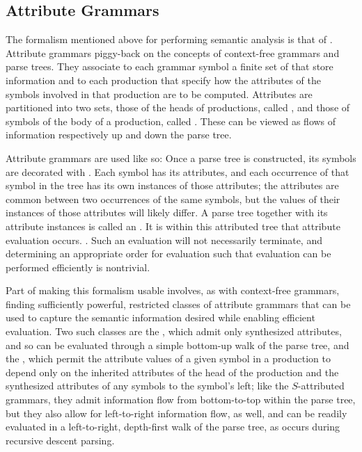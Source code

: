 \subsection{Attribute Grammars}
The formalism mentioned above for performing semantic analysis is that of . Attribute grammars piggy-back on the concepts of context-free grammars and parse trees. They associate to each grammar symbol a finite set of  that store information and to each production  that specify how the attributes of the symbols involved in that production are to be computed. Attributes are partitioned into two sets, those of the heads of productions, called , and those of symbols of the body of a production, called . These can be viewed as flows of information respectively up and down the parse tree.

Attribute grammars are used like so: Once a parse tree is constructed, its symbols are decorated with . Each symbol has its attributes, and each occurrence of that symbol in the tree has its own instances of those attributes; the attributes are common between two occurrences of the same symbols, but the values of their instances of those attributes will likely differ. A parse tree together with its attribute instances is called an . It is within this attributed tree that attribute evaluation occurs. . Such an evaluation will not necessarily terminate, and determining an appropriate order for evaluation such that evaluation can be performed efficiently is nontrivial.

Part of making this formalism usable involves, as with context-free grammars, finding sufficiently powerful, restricted classes of attribute grammars that can be used to capture the semantic information desired while enabling efficient evaluation. Two such classes are the , which admit only synthesized attributes, and so can be evaluated through a simple bottom-up walk of the parse tree, and the , which permit the attribute values of a given symbol in a production to depend only on the inherited attributes of the head of the production and the synthesized attributes of any symbols to the symbol's left; like the $S$-attributed grammars, they admit information flow from bottom-to-top within the parse tree, but they also allow for left-to-right information flow, as well, and can be readily evaluated in a left-to-right, depth-first walk of the parse tree, as occurs during recursive descent parsing.

